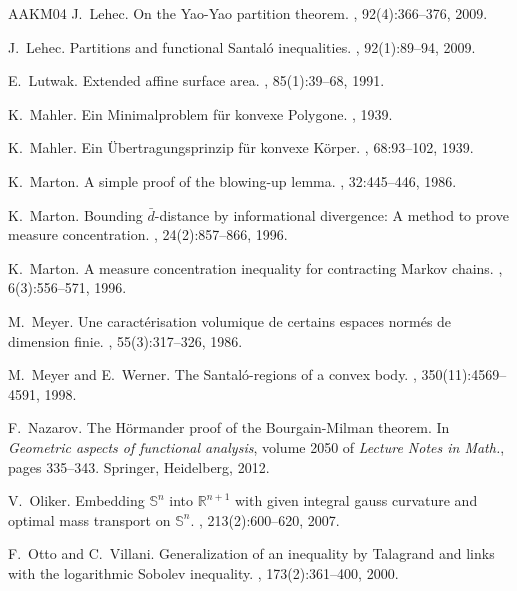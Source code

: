 \documentclass[10pt]{amsart}
\theoremstyle{definition}
\theoremstyle{remark}
\begin{document}
\begin{thebibliography}{AAKM04}
J.~Lehec.
\newblock On the {Yao}-{Yao} partition theorem.
, 92(4):366--376, 2009.

J.~Lehec.
\newblock Partitions and functional {Santal{\'o}} inequalities.
, 92(1):89--94, 2009.

E.~Lutwak.
\newblock Extended affine surface area.
, 85(1):39--68, 1991.

K.~Mahler.
\newblock Ein {M}inimalproblem f\"{u}r konvexe {P}olygone.
, 1939.

K.~Mahler.
\newblock Ein \"{U}bertragungsprinzip f\"{u}r konvexe {K}\"{o}rper.
, 68:93--102, 1939.

K.~Marton.
\newblock A simple proof of the blowing-up lemma.
, 32:445--446, 1986.

K.~Marton.
\newblock Bounding {{$\bar d$}}-distance by informational divergence: {A}
  method to prove measure concentration.
, 24(2):857--866, 1996.

K.~Marton.
\newblock A measure concentration inequality for contracting {Markov} chains.
, 6(3):556--571, 1996.

M.~Meyer.
\newblock Une caract\'{e}risation volumique de certains espaces norm\'{e}s de
  dimension finie.
, 55(3):317--326, 1986.

M.~Meyer and E.~Werner.
\newblock The {Santal{\'o}}-regions of a convex body.
, 350(11):4569--4591, 1998.

F.~Nazarov.
\newblock The {H}\"{o}rmander proof of the {B}ourgain-{M}ilman theorem.
\newblock In {\em Geometric aspects of functional analysis}, volume 2050 of
  {\em Lecture Notes in Math.}, pages 335--343. Springer, Heidelberg, 2012.

V.~Oliker.
\newblock Embedding {{$\mathbb S^n$}} into {{$\mathbb R^{n+1}$}} with given
  integral gauss curvature and optimal mass transport on {{$\mathbb S^n$}}.
, 213(2):600--620, 2007.

F.~Otto and C.~Villani.
\newblock Generalization of an inequality by {Talagrand} and links with the
  logarithmic {Sobolev} inequality.
, 173(2):361--400, 2000.


\end{thebibliography}
\end{document}
